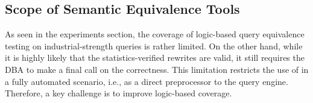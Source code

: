 \subsection{Scope of Semantic Equivalence Tools}
As seen in the experiments section, the coverage of logic-based query equivalence testing on industrial-strength queries is rather limited.
On the other hand, while it is highly likely that the statistics-verified rewrites are valid, it still requires the DBA to make a final call on the correctness. 
%
This limitation restricts the use of \lithe in a fully automated scenario, i.e., as a direct preprocessor to the query engine. Therefore, a key challenge is to improve logic-based coverage. 
